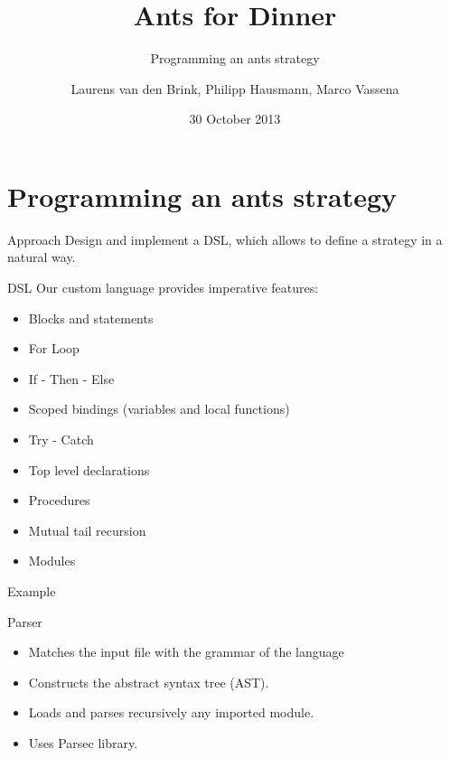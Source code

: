 \documentclass{beamer}
\title{Ants for Dinner}
\subtitle{Programming an ants strategy}
\author{Laurens van den Brink, Philipp Hausmann, Marco Vassena}
\date{30 October 2013}
\begin{document}
\begin{frame}
  \titlepage
\end{frame}


\section{Programming an ants strategy}
\begin{frame}{Approach}
	Design and implement a DSL, which allows to define a strategy in a natural way.
\end{frame}

\begin{frame}[fragile]{DSL}
	Our custom language provides imperative features:
	\begin{itemize}
		\item Blocks and statements
		\item For Loop
		\item If - Then - Else
		\item Scoped bindings (variables and local functions)
		\item Try - Catch
		\item Top level declarations
		\item Procedures
		\item Mutual tail recursion
		\item Modules
	\end{itemize}
\end{frame}

\lstset{basicstyle=\footnotesize}
\begin{frame}
	\begin{block}{Example}
        
	\end{block}
\end{frame}


\begin{frame}{Parser}

	\begin{itemize}
		\item Matches the input file with the grammar of the language
		\item Constructs the abstract syntax tree (AST).
		\item Loads and parses recursively any imported module.
		\item Uses Parsec library.
	\end{itemize}
	
\end{frame}
\end{document}
